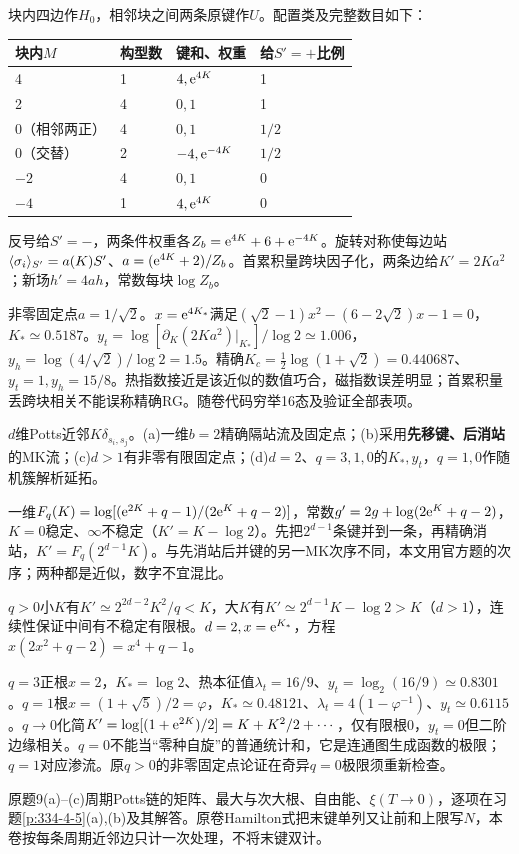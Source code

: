 \begin{solution}
块内四边作$H_0$，相邻块之间两条原键作$U$。配置类及完整数目如下：
\begin{center}\begin{tabular}{llll}\toprule 块内$M$&构型数&键和、权重&给$S'=+$比例\\\midrule 4&1&$4,\mathrm e^{4K}$&1\\ 2&4&$0,1$&1\\ 0（相邻两正）&4&$0,1$&$1/2$\\ 0（交替）&2&$-4,\mathrm e^{-4K}$&$1/2$\\ $-2$&4&$0,1$&0\\ $-4$&1&$4,\mathrm e^{4K}$&0\\\bottomrule\end{tabular}\end{center}
反号给$S'=-$，两条件权重各$Z_b=\mathrm e^{4K}+6+\mathrm e^{-4K}$。旋转对称使每边站$\langle \sigma_i\rangle_{S'}=a(K)S'$、$a=(\mathrm e^{4K}+2)/Z_b$。首累积量跨块因子化，两条边给$K'=2Ka^2$；新场$h'=4ah$，常数每块$\log Z_b$。

非零固定点$a=1/\sqrt2$。$x=\mathrm e^{4K_*}$满足$(\sqrt2-1)x^2-(6-2\sqrt2)x-1=0$，$K_*\simeq0.5187$。$y_t=\log[\partial_K(2Ka^2)|_{K_*}]/\log2\simeq1.006$，$y_h=\log(4/\sqrt2)/\log2=1.5$。精确$K_c=\tfrac12\log(1+\sqrt2)=0.440687$、$y_t=1,y_h=15/8$。热指数接近是该近似的数值巧合，磁指数误差明显；首累积量丢跨块相关不能误称精确RG。随卷代码穷举16态及验证全部表项。
\end{solution}
\begin{exercise}[原题8(a)--(d)]\label{r:334-2-8}
$d$维Potts近邻$K\delta_{s_i,s_j}$。(a)一维$b=2$精确隔站流及固定点；(b)采用\textbf{先移键、后消站}的MK流；(c)$d>1$有非零有限固定点；(d)$d=2$、$q=3,1,0$的$K_*,y_t$，$q=1,0$作随机簇解析延拓。
\end{exercise}
\begin{solution}
一维$F_q(K)=\log[(\mathrm e^{2K}+q-1)/(2\mathrm e^K+q-2)]$，常数$g'=2g+\log(2\mathrm e^K+q-2)$，$K=0$稳定、$\infty$不稳定（$K'=K-\log2$）。先把$2^{d-1}$条键并到一条，再精确消站，$K'=F_q(2^{d-1}K)$。与先消站后并键的另一MK次序不同，本文用官方题的次序；两种都是近似，数字不宜混比。

$q>0$小$K$有$K'\simeq2^{2d-2}K^2/q<K$，大$K$有$K'\simeq2^{d-1}K-\log2>K$（$d>1$），连续性保证中间有不稳定有限根。$d=2,x=\mathrm e^{K_*}$，方程$x(2x^2+q-2)=x^4+q-1$。

$q=3$正根$x=2$，$K_*=\log2$、热本征值$\lambda_t=16/9$、$y_t=\log_2(16/9)\simeq0.8301$。$q=1$根$x=(1+\sqrt5)/2=\varphi$，$K_*\simeq0.48121$、$\lambda_t=4(1-\varphi^{-1})$、$y_t\simeq0.6115$。$q\to0$化简$K'=\log[(1+\mathrm e^{2K})/2]=K+K^2/2+\cdots$，仅有限根0，$y_t=0$但二阶边缘相关。$q=0$不能当“零种自旋”的普通统计和，它是连通图生成函数的极限；$q=1$对应渗流。原$q>0$的非零固定点论证在奇异$q=0$极限须重新检查。
\end{solution}
原题9(a)--(c)周期Potts链的矩阵、最大与次大根、自由能、$\xi(T\to0)$，逐项在习题\ref{p:334-4-5}(a),(b)及其解答。原卷Hamilton式把末键单列又让前和上限写$N$，本卷按每条周期近邻边只计一次处理，不将末键双计。
